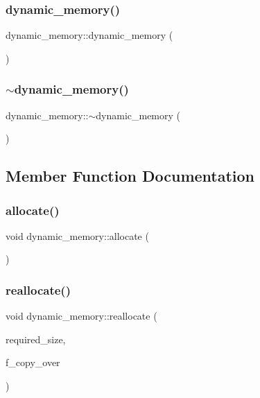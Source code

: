 \subsubsection{\texorpdfstring{dynamic\+\_\+memory()}{dynamic\_memory()}}
{\footnotesize\ttfamily dynamic\+\_\+memory\+::dynamic\+\_\+memory (\begin{DoxyParamCaption}{ }\end{DoxyParamCaption})}

\mbox{\label{classdynamic__memory_a67470bdbf754367a87664be38ff84afe}} 
\subsubsection{\texorpdfstring{$\sim$dynamic\+\_\+memory()}{~dynamic\_memory()}}
{\footnotesize\ttfamily dynamic\+\_\+memory\+::$\sim$dynamic\+\_\+memory (\begin{DoxyParamCaption}{ }\end{DoxyParamCaption})}



\subsection{Member Function Documentation}
\mbox{\label{classdynamic__memory_ad8002b6ce73cb398b72abf2b3169d161}} 
\subsubsection{\texorpdfstring{allocate()}{allocate()}}
{\footnotesize\ttfamily void dynamic\+\_\+memory\+::allocate (\begin{DoxyParamCaption}{ }\end{DoxyParamCaption})}

\mbox{\label{classdynamic__memory_abe9a2bb157f057efce1c7dc15b00a09f}} 
\subsubsection{\texorpdfstring{reallocate()}{reallocate()}}
{\footnotesize\ttfamily void dynamic\+\_\+memory\+::reallocate (\begin{DoxyParamCaption}\item[{\mbox{\hyperlink{galois_8h_a09fddde158a3a20bd2dcadb609de11dc}{I\+NT}}}]{required\+\_\+size,  }\item[{\mbox{\hyperlink{galois_8h_a09fddde158a3a20bd2dcadb609de11dc}{I\+NT}}}]{f\+\_\+copy\+\_\+over }\end{DoxyParamCaption})}



